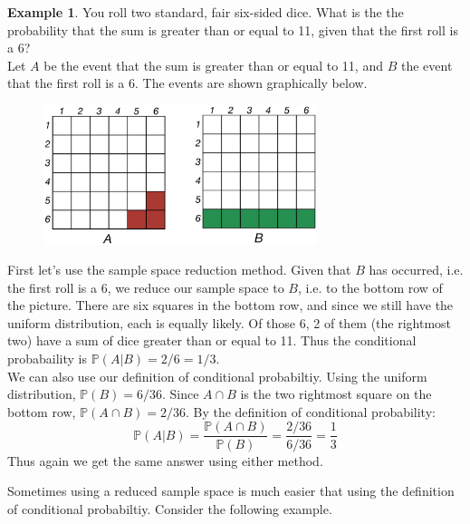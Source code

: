 \documentclass[12pt]{article}
\theoremstyle{definition}
\newtheorem*{example}{Example}
\theoremstyle{remark}
\def\P{{\mathbb P}}
\begin{document}
\begin{example}
You roll two standard, fair six-sided dice. What is the the probability that the sum is greater than or equal to 11, given that the first roll is a 6?\\

Let $A$ be the event that the sum is greater than or equal to 11, and $B$ the event that the first roll is a 6. The events are shown graphically below.
\begin{figure}[H]
\centering
\includegraphics[width=8cm]{2dice1.eps}
\end{figure}
First let's use the sample space reduction method. Given that $B$ has occurred, i.e. the first roll is a 6, we reduce our sample space to $B$, i.e. to the bottom row of the picture. There are six squares in the bottom row, and since we still have the uniform distribution, each is equally likely. Of those 6, 2 of them (the rightmost two) have a sum of dice greater than or equal to 11. Thus the conditional probabaility is $\P(A|B) = 2/6 = 1/3$.\\

We can also use our definition of conditional probabiltiy. Using the uniform distribution, $\P(B) = 6/36$. Since $A \cap B$ is the two rightmost square on the bottom row, $\P(A \cap B) = 2/36$. By the definition of conditional probability:
\[
\P(A|B) = \frac{ \P(A \cap B)}{\P(B)} = \frac{2/36}{6/36} = \frac{1}{3}
\]
Thus again we get the same answer using either method.
\end{example}

Sometimes using a reduced sample space is much easier that using the definition of conditional probabiltiy. Consider the following example.
\end{document}
